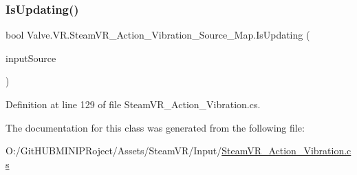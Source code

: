 \subsubsection{\texorpdfstring{IsUpdating()}{IsUpdating()}}
{\footnotesize\ttfamily bool Valve.\+V\+R.\+Steam\+V\+R\+\_\+\+Action\+\_\+\+Vibration\+\_\+\+Source\+\_\+\+Map.\+Is\+Updating (\begin{DoxyParamCaption}\item[{\mbox{\hyperlink{namespace_valve_1_1_v_r_a82e5bf501cc3aa155444ee3f0662853f}{Steam\+V\+R\+\_\+\+Input\+\_\+\+Sources}}}]{input\+Source }\end{DoxyParamCaption})}



Definition at line 129 of file Steam\+V\+R\+\_\+\+Action\+\_\+\+Vibration.\+cs.



The documentation for this class was generated from the following file\+:\begin{DoxyCompactItemize}
\item 
O\+:/\+Git\+H\+U\+B\+M\+I\+N\+I\+P\+Roject/\+Assets/\+Steam\+V\+R/\+Input/\mbox{\hyperlink{_steam_v_r___action___vibration_8cs}{Steam\+V\+R\+\_\+\+Action\+\_\+\+Vibration.\+cs}}\end{DoxyCompactItemize}
